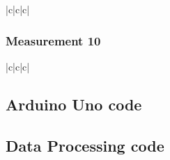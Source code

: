 \documentclass[a4paper]{article}
\makeatletter
\let\mcnewpage=\newpage
\newcommand{\TrickSupertabularIntoMulticols}{%
  \renewcommand\newpage{%
    \if@firstcolumn
      \hrule width\linewidth height0pt
      \columnbreak
    \else
      \mcnewpage
    \fi
  }%
}
\makeatother
\begin{document}
\begin{multicols}{3}

  \TrickSupertabularIntoMulticols

  \begin{supertabular}{|c|c|c|}
  \end{supertabular}

\end{multicols}

\pagebreak

\subsubsection*{Measurement 10}

\begin{multicols}{3}

  \TrickSupertabularIntoMulticols

  \begin{supertabular}{|c|c|c|}
  \end{supertabular}

\end{multicols}

\pagebreak

\subsection*{Arduino Uno code}


\subsection*{Data Processing code}

\end{document}
